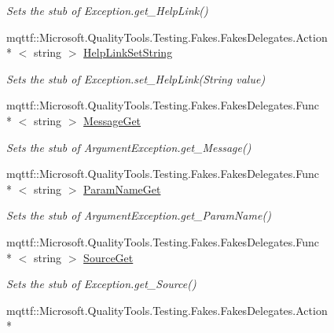 \begin{DoxyCompactItemize}
\begin{DoxyCompactList}\small\item\em Sets the stub of Exception.\-get\-\_\-\-Help\-Link()\end{DoxyCompactList}\item 
mqttf\-::\-Microsoft.\-Quality\-Tools.\-Testing.\-Fakes.\-Fakes\-Delegates.\-Action\\*
$<$ string $>$ \hyperlink{class_system_1_1_component_model_1_1_fakes_1_1_stub_invalid_enum_argument_exception_a13be59fefbaee5666d01e438489f4f6c}{Help\-Link\-Set\-String}
\begin{DoxyCompactList}\small\item\em Sets the stub of Exception.\-set\-\_\-\-Help\-Link(\-String value)\end{DoxyCompactList}\item 
mqttf\-::\-Microsoft.\-Quality\-Tools.\-Testing.\-Fakes.\-Fakes\-Delegates.\-Func\\*
$<$ string $>$ \hyperlink{class_system_1_1_component_model_1_1_fakes_1_1_stub_invalid_enum_argument_exception_a8df8429cb04cd5ee87eced04e4d167c7}{Message\-Get}
\begin{DoxyCompactList}\small\item\em Sets the stub of Argument\-Exception.\-get\-\_\-\-Message()\end{DoxyCompactList}\item 
mqttf\-::\-Microsoft.\-Quality\-Tools.\-Testing.\-Fakes.\-Fakes\-Delegates.\-Func\\*
$<$ string $>$ \hyperlink{class_system_1_1_component_model_1_1_fakes_1_1_stub_invalid_enum_argument_exception_a5d4d9e46b562fc059f244c1f0fe15dcd}{Param\-Name\-Get}
\begin{DoxyCompactList}\small\item\em Sets the stub of Argument\-Exception.\-get\-\_\-\-Param\-Name()\end{DoxyCompactList}\item 
mqttf\-::\-Microsoft.\-Quality\-Tools.\-Testing.\-Fakes.\-Fakes\-Delegates.\-Func\\*
$<$ string $>$ \hyperlink{class_system_1_1_component_model_1_1_fakes_1_1_stub_invalid_enum_argument_exception_ada8c80bcbb13dbd6a35a6135ab3b6599}{Source\-Get}
\begin{DoxyCompactList}\small\item\em Sets the stub of Exception.\-get\-\_\-\-Source()\end{DoxyCompactList}\item 
mqttf\-::\-Microsoft.\-Quality\-Tools.\-Testing.\-Fakes.\-Fakes\-Delegates.\-Action\\*

\end{DoxyCompactItemize}
